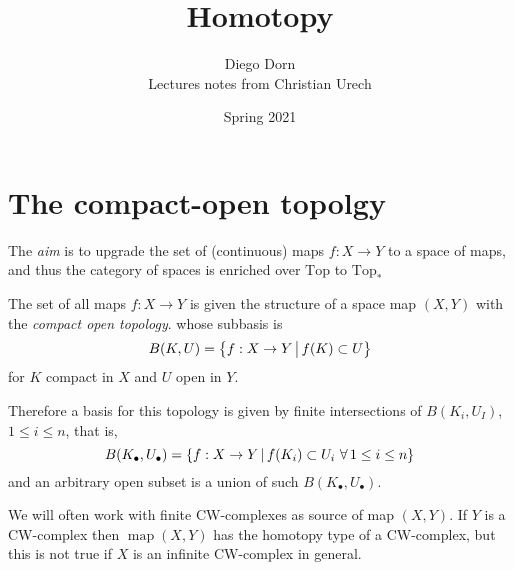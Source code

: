 


\title{Homotopy }
\author{Diego Dorn \\ Lectures notes from Christian Urech}
\date{Spring 2021}

\newcommand{\homeo}{\approx}
\newcommand{\mapspace}{\operatorname{map}}
\newcommand{\Top}{\mathrm{Top}}


    \maketitle


    \section{The compact-open topolgy}

    The \emph{aim} is to upgrade the set of (continuous) maps $f:X \to Y$
    to a space of maps, and thus the category of spaces is enriched over $\Top$ to $\Top_*$

    \begin{definition}
        The set of all maps $f: X \to Y$ is given the structure of a space map $(X, Y)$
        with the \emph{compact open topology}.
        whose subbasis is 
        \[
            B(K, U) = \big\{ f: X \to Y  \, \big| \, 
                f(K) \subset U
             \big\}
        \]
        for $K$ compact in $X$ and $U$ open in $Y$.
    \end{definition}

    Therefore a basis for this topology is given by finite intersections of $B(K_i, U_I)$, 
    $1 \leq i \leq n$, that is, 
    \[
        B(K_\bullet, U_\bullet) = \left\{ f: X \to Y  \, \middle| \, 
            f(K_i) \subset U_i~
            \forall\, 1 \leq i \leq n
         \right\}
    \]
    and an arbitrary open subset is a union of such $B(K_\bullet, U_\bullet)$.

    \begin{remark}
        We will often work with finite CW-complexes as source of map $(X, Y)$.
        If $Y$ is a CW-complex then $\mapspace(X, Y)$ has the homotopy type
        of a CW-complex, but this is not true if $X$ is an infinite CW-complex in general.
    \end{remark}

